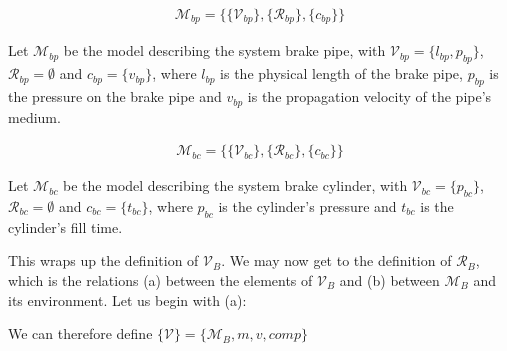 \begin{align*}
{\mathcal {M}}_{bp} = \{ \{{\mathcal {V}}_{bp}\}, \{{\mathcal{R}}_{bp}\}, \{c_{bp}\} \}
\end{align*}

\noindent
Let ${\mathcal {M}}_{bp}$ be the model describing the system brake pipe, with ${\mathcal {V}}_{bp} = \{ l_{bp}, p_{bp} \}$, ${\mathcal {R}}_{bp} = \emptyset$ and $c_{bp} = \{ v_{bp} \}$, where $l_{bp}$ is the physical length of the brake pipe, $p_{bp}$ is the pressure on the brake pipe and $v_{bp}$ is the propagation velocity of the pipe's medium. 

\begin{align*}
{\mathcal {M}}_{bc} = \{ \{{\mathcal {V}}_{bc}\}, \{{\mathcal{R}}_{bc}\}, \{c_{bc}\} \}
\end{align*}

\noindent
Let ${\mathcal {M}}_{bc}$ be the model describing the system brake cylinder, with ${\mathcal {V}}_{bc} = \{ p_{bc} \}$, ${\mathcal {R}}_{bc} = \emptyset$ and $c_{bc} = \{ t_{bc} \}$, where $p_{bc}$ is the cylinder's pressure and $t_{bc}$ is the cylinder's fill time.
\bigskip
\par\noindent
This wraps up the definition of ${\mathcal{V}}_{B}$. We may now get to the definition of ${\mathcal{R}}_{B}$, which is the relations (a) between the elements of ${\mathcal{V}}_{B}$ and (b) between ${\mathcal{M}}_{B}$ and its environment. Let us begin with (a):
\par


\bigskip\noindent{}
\par\noindent
We can therefore define $\{{\mathcal {V}}\} = \{{\mathcal {M}}_{B},m,v,comp\}$

